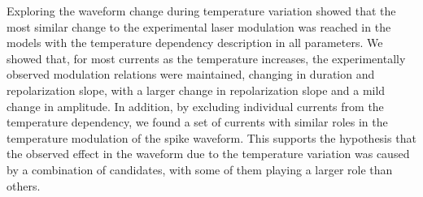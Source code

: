 Exploring the waveform change during temperature variation showed that the most similar change to the experimental laser modulation was reached in the models with the temperature dependency description in all parameters. We showed that, for most currents as the temperature increases, the experimentally observed modulation relations were maintained, changing in duration and repolarization slope, with a larger change in repolarization slope and a mild change in amplitude. In addition, by excluding individual currents from the temperature dependency, we found a set of currents with similar roles in the temperature modulation of the spike waveform. This supports the hypothesis that the observed effect in the waveform due to the temperature variation was caused by a combination of candidates, with some of them playing a larger role than others. 


